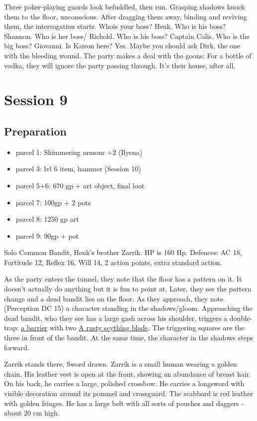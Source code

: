 Three poker-playing guards look befuddled, then run. Grasping shadows knock them to the floor, unconscious. After dragging them away, binding and reviving them, the interrogation starts. Whois your boss? Henk. Who is his boss? Shannon. Who is her boss/ Richold. Who is his boss? Captain Calis. Who is the big boss? Giovanni. Is Kairon here? Yes. Maybe you should ask Dirk, the one with the bleeding wound. The party makes a deal with the goons: For a bottle of vodka, they will ignore the party passing through. It's their house, after all.

\chapter{Session 9}
\section{Preparation}
\begin{itemize}
\item parcel 1: Shimmering armour +2 (Ilyena)
\item parcel 3: lvl 6 item, hammer (Session 10)
\item parcel 5+6: 670 gp + art object, final loot
\item parcel 7: 100gp + 2 pots
\item parcel 8: 1250 gp art
\item parcel 9: 90gp + pot
\end{itemize}

Solo Common Bandit, Henk's brother Zarrik. HP is 160 Hp. Defences: AC 18, Fortitude 12, Reflex 16, Will 14, 2 action points, extra standard action.

As the party enters the tunnel, they note that the floor has a pattern on it. It doesn't actually do anything but it is fun to point at. Later, they see the pattern change and a dead bandit lies on the floor. As they approach, they note (Perception DC 15) a character standing in the shadows/gloom. Approaching the dead bandit, who they see has a large gash across his shoulder, triggers a double-trap: \href{https://www.dandwiki.com/wiki/One-way_barrier_(4e_Trap)}{a barrier} with two \href{https://www.dandwiki.com/wiki/Scything_Blade_Trap_(4e_Trap)}{A rusty scything blade}. The triggering squares are the three in front of the bandit. At the same time, the character in the shadows steps forward.

Zarrik stands there, Sword drawn. Zarrik is a small human wearing a golden chain. His leather vest is open at the front, showing an abundance of breast hair. On his back, he carries a large, polished crossbow. He carries a longsword with visible decoration around its pommel and crossguard. The scabbard is red leather with golden fringes. He has a large belt with all sorts of pouches and daggers - about 20 cm high. 


